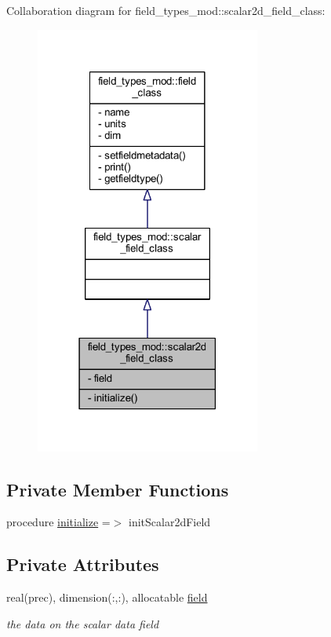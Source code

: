 Collaboration diagram for field\+\_\+types\+\_\+mod\+:\+:scalar2d\+\_\+field\+\_\+class\+:
\nopagebreak
\begin{figure}[H]
\begin{center}
\leavevmode
\includegraphics[width=210pt]{structfield__types__mod_1_1scalar2d__field__class__coll__graph}
\end{center}
\end{figure}
\subsection*{Private Member Functions}
\begin{DoxyCompactItemize}
\item 
procedure \mbox{\hyperlink{structfield__types__mod_1_1scalar2d__field__class_a78514d47bb800d9945fefb22bdf16073}{initialize}} =$>$ init\+Scalar2d\+Field
\end{DoxyCompactItemize}
\subsection*{Private Attributes}
\begin{DoxyCompactItemize}
\item 
real(prec), dimension(\+:,\+:), allocatable \mbox{\hyperlink{structfield__types__mod_1_1scalar2d__field__class_a118246d78eca3dd11517254a4bf5fef0}{field}}
\begin{DoxyCompactList}\small\item\em the data on the scalar data field \end{DoxyCompactList}\end{DoxyCompactItemize}


